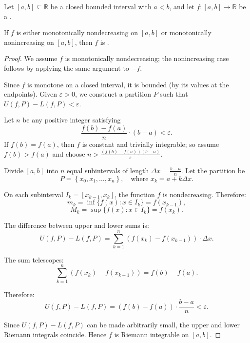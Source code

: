 \begin{proposition} \label{proposition:monotone_functions_are_riemann_integrable_on_closed_intervals}
    Let $[a, b] \subseteq \mathbb{R}$ be a closed bounded interval with $a < b$, and let $f : [a, b] \to \mathbb{R}$ be a .

    If $f$ is either monotonically nondecreasing on $[a, b]$ or monotonically nonincreasing on $[a, b]$, then $f$ is .
\end{proposition}
\begin{proof}
    We assume $f$ is monotonically nondecreasing; the nonincreasing case follows by applying the same argument to $-f$.

    Since $f$ is monotone on a closed interval, it is bounded (by its values at the endpoints). Given $\varepsilon > 0$, we construct a partition $P$ such that $U(f,P) - L(f,P) < \varepsilon$.

    Let $n$ be any positive integer satisfying
    $$\frac{f(b) - f(a)}{n} \cdot (b-a) < \varepsilon.$$
    If $f(b) = f(a)$, then $f$ is constant and trivially integrable; so assume $f(b) > f(a)$ and choose $n > \frac{(f(b)-f(a))(b-a)}{\varepsilon}$.

    Divide $[a, b]$ into $n$ equal subintervals of length $\Delta x = \frac{b-a}{n}$. Let the partition be
    $$P = \left\{x_0, x_1, \dots, x_n\right\}, \quad \text{where } x_k = a + k\Delta x.$$

    On each subinterval $I_k = [x_{k-1}, x_k]$, the function $f$ is nondecreasing. Therefore:
    $$m_k = \inf\{f(x) : x \in I_k\} = f(x_{k-1}),$$
    $$M_k = \sup\{f(x) : x \in I_k\} = f(x_k).$$

    The difference between upper and lower sums is:
    $$U(f,P) - L(f,P) = \sum_{k=1}^n (f(x_k) - f(x_{k-1})) \cdot \Delta x.$$

    The sum telescopes:
    $$\sum_{k=1}^n (f(x_k) - f(x_{k-1})) = f(b) - f(a).$$

    Therefore:
    $$U(f,P) - L(f,P) = (f(b) - f(a)) \cdot \frac{b-a}{n} < \varepsilon.$$

    Since $U(f,P) - L(f,P)$ can be made arbitrarily small, the upper and lower Riemann integrals coincide. Hence $f$ is Riemann integrable on $[a, b]$.
\end{proof}
